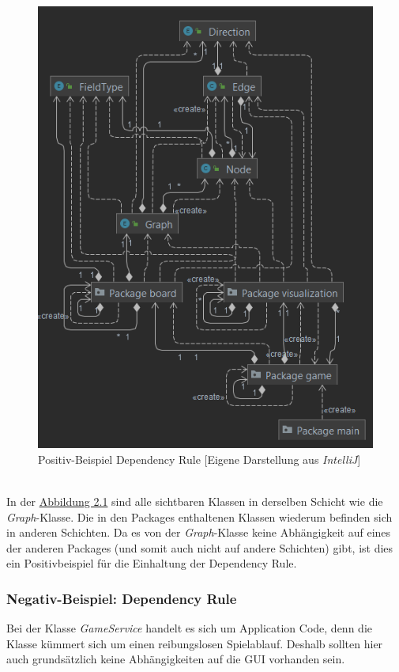 \newpage
\noindent
\begin{figure}[htbp]
\centering
\centerline{\includegraphics[scale=.5]{dependencyrule_klasse_graph}}
\caption{Positiv-Beispiel Dependency Rule [Eigene Darstellung aus \emph{IntelliJ}]}
\label{fig:dependencyrulepositiv}
\end{figure}
\\
\noindent In der \hyperref[fig:dependencyrulepositiv]{Abbildung 2.1} sind alle sichtbaren Klassen in derselben Schicht wie die \emph{Graph}-Klasse. Die in den Packages enthaltenen Klassen wiederum befinden sich in anderen Schichten. Da es von der \emph{Graph}-Klasse keine Abhängigkeit auf eines der anderen Packages (und somit auch nicht auf andere Schichten) gibt, ist dies ein Positivbeispiel für die Einhaltung der Dependency Rule.

\newpage
\noindent

\subsubsection{Negativ-Beispiel: Dependency Rule}
\noindent Bei der Klasse \emph{GameService} handelt es sich um Application Code, denn die Klasse kümmert sich um einen reibungslosen Spielablauf. Deshalb sollten hier auch grundsätzlich keine Abhängigkeiten auf die \acs{GUI} vorhanden sein.

